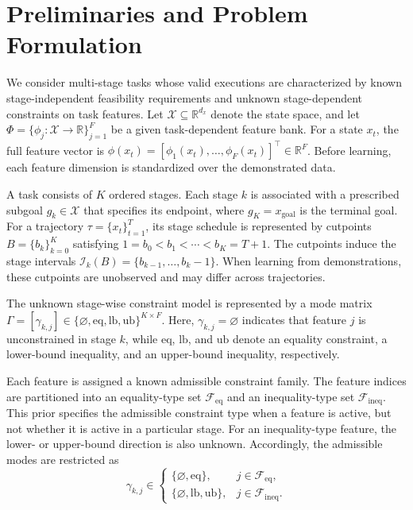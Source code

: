 \section{Preliminaries and Problem Formulation}

We consider multi-stage tasks whose valid executions are characterized by known stage-independent feasibility requirements and unknown stage-dependent constraints on task features. Let $\mathcal{X}\subseteq\mathbb{R}^{d_x}$ denote the state space, and let $\Phi=\{\phi_j:\mathcal{X}\rightarrow\mathbb{R}\}_{j=1}^{F}$ be a given task-dependent feature bank. For a state $x_t$, the full feature vector is $\phi(x_t)=[\phi_1(x_t),\dots,\phi_F(x_t)]^\top\in\mathbb{R}^{F}$. Before learning, each feature dimension is standardized over the demonstrated data.

A task consists of $K$ ordered stages. Each stage $k$ is associated with a prescribed subgoal $g_k\in\mathcal{X}$ that specifies its endpoint, where $g_K=x_{\mathrm{goal}}$ is the terminal goal. For a trajectory $\tau=\{x_t\}_{t=1}^{T}$, its stage schedule is represented by cutpoints $B=\{b_k\}_{k=0}^{K}$ satisfying $1=b_0<b_1<\cdots<b_K=T+1$. The cutpoints induce the stage intervals $\mathcal{I}_k(B)=\{b_{k-1},\dots,b_k-1\}$. When learning from demonstrations, these cutpoints are unobserved and may differ across trajectories.

The unknown stage-wise constraint model is represented by a mode matrix $\Gamma=[\gamma_{k,j}]\in\{\varnothing,\mathrm{eq},\mathrm{lb},\mathrm{ub}\}^{K\times F}$. Here, $\gamma_{k,j}=\varnothing$ indicates that feature $j$ is unconstrained in stage $k$, while $\mathrm{eq}$, $\mathrm{lb}$, and $\mathrm{ub}$ denote an equality constraint, a lower-bound inequality, and an upper-bound inequality, respectively.

Each feature is assigned a known admissible constraint family. The feature indices are partitioned into an equality-type set $\mathcal{F}_{\mathrm{eq}}$ and an inequality-type set $\mathcal{F}_{\mathrm{ineq}}$. This prior specifies the admissible constraint type when a feature is active, but not whether it is active in a particular stage. For an inequality-type feature, the lower- or upper-bound direction is also unknown. Accordingly, the admissible modes are restricted as
\begin{equation}
\gamma_{k,j}\in
\begin{cases}
\{\varnothing,\mathrm{eq}\}, & j\in\mathcal{F}_{\mathrm{eq}},\\
\{\varnothing,\mathrm{lb},\mathrm{ub}\}, & j\in\mathcal{F}_{\mathrm{ineq}}.
\end{cases}
\label{eq:admissible_constraint_modes}
\end{equation}

